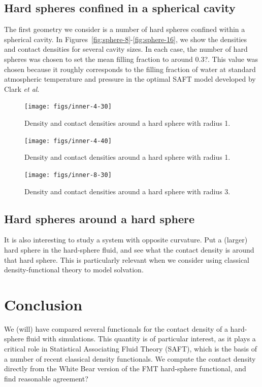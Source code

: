 \documentclass[letterpaper,twocolumn,amsmath,amssymb,jcp,10pt,aip]{revtex4-1}
\begin{document}
\subsection{Hard spheres confined in a spherical cavity}

The first geometry we consider is a number of hard spheres confined
within a spherical cavity.  In
Figures~\ref{fig:sphere-8}-\ref{fig:sphere-16}, we show
the densities and contact densities for several cavity sizes.  In each
case, the number of hard spheres was chosen to set the mean filling
fraction to around 0.3?.  This value was chosen because it roughly
corresponds to the filling fraction of water at standard atmospheric
temperature and pressure in the optimal SAFT model developed by Clark
\emph{et al}\cite{clark2006developing}.



\begin{figure}
  \texttt{[image: figs/inner-4-30]}
  \caption{Density and contact densities around a hard sphere with
    radius 1.}
  \label{fig:inner-4-30}
\end{figure}

\begin{figure}
  \texttt{[image: figs/inner-4-40]}
  \caption{Density and contact densities around a hard sphere with
    radius 1.}
  \label{fig:inner-4-40}
\end{figure}

\begin{figure}
  \texttt{[image: figs/inner-8-30]}
  \caption{Density and contact densities around a hard sphere with
    radius 3.}
  \label{fig:inner-8-30}
\end{figure}

\subsection{Hard spheres around a hard sphere}

It is also interesting to study a system with opposite curvature.  Put
a (larger) hard sphere in the hard-sphere fluid, and see what the
contact density is around that hard sphere.  This is particularly
relevant when we consider using classical density-functional theory to
model solvation.


\section{Conclusion}
We (will) have compared several functionals for the contact density of
a hard-sphere fluid with simulations.  This quantity is of particular
interest, as it plays a critical role in Statistical Associating Fluid
Theory (SAFT), which is the basis of a number of recent classical
density functionals.  We compute the contact density directly from the
White Bear version of the FMT hard-sphere functional, and find
reasonable agreement?
\end{document}
